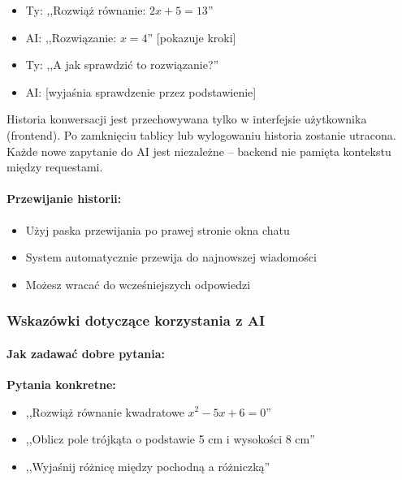 \documentclass[12pt,a4paper]{article}
\begin{document}
\begin{itemize}
    \item Ty: ,,Rozwiąż równanie: $2x + 5 = 13$''
    \item AI: ,,Rozwiązanie: $x = 4$'' [pokazuje kroki]
    \item Ty: ,,A jak sprawdzić to rozwiązanie?''
    \item AI: [wyjaśnia sprawdzenie przez podstawienie]
\end{itemize}

\begin{tcolorbox}[colback=yellow!10!white,colframe=orange!75!black,title=\faExclamationTriangle\ Uwaga]
Historia konwersacji jest przechowywana tylko w interfejsie użytkownika (frontend). Po zamknięciu tablicy lub wylogowaniu historia zostanie utracona. Każde nowe zapytanie do AI jest niezależne -- backend nie pamięta kontekstu między requestami.
\end{tcolorbox}

\paragraph{Przewijanie historii:}

\begin{itemize}
    \item Użyj paska przewijania po prawej stronie okna chatu
    \item System automatycznie przewija do najnowszej wiadomości
    \item Możesz wracać do wcześniejszych odpowiedzi
\end{itemize}

\subsubsection{Wskazówki dotyczące korzystania z AI}

\paragraph{Jak zadawać dobre pytania:}

\textbf{Pytania konkretne:}
\begin{itemize}
    \item ,,Rozwiąż równanie kwadratowe $x^2 - 5x + 6 = 0$''
    \item ,,Oblicz pole trójkąta o podstawie 5 cm i wysokości 8 cm''
    \item ,,Wyjaśnij różnicę między pochodną a różniczką''
\end{itemize}
\end{document}
